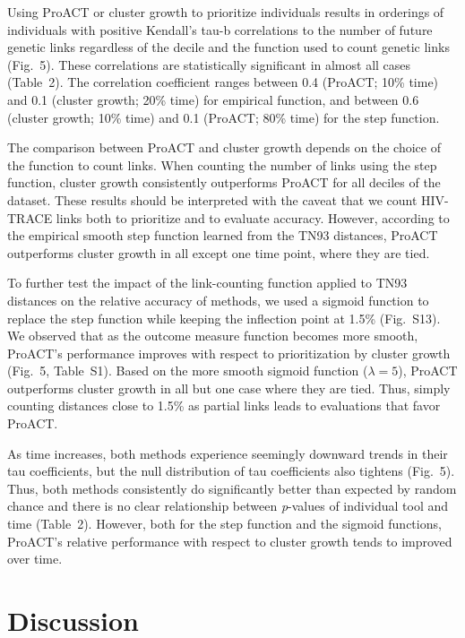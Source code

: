 \documentclass[a4paper,11pt]{article}
\begin{document}
Using ProACT or cluster growth to prioritize individuals results in orderings of individuals with positive Kendall's tau-b correlations to the number of future genetic links  regardless of the  decile and the function used to count genetic links (Fig.~5).  
These correlations are statistically significant in almost all cases  (Table~2). 
The  correlation coefficient  ranges between 0.4 (ProACT; 10\% time)  and 0.1 (cluster growth; 20\% time) for empirical function, and 
between 0.6 (cluster growth; 10\% time) and 0.1 (ProACT; 80\% time) for the step function.

The comparison between ProACT and cluster growth depends on the choice of the function to count links. 
When counting the number of links using the step function,
cluster growth consistently outperforms ProACT for all deciles of the dataset.
These results should be interpreted with the caveat  that we count HIV-TRACE links both to prioritize and to evaluate accuracy. 
However, 
according to the empirical smooth step function learned from the TN93 distances, ProACT outperforms cluster growth in all except one time point, where they are tied.

To further test the impact of the link-counting function applied to TN93 distances on  the relative accuracy of methods, we used a sigmoid function to replace the step function while keeping the inflection point at 1.5\% (Fig.~S13). 
We observed that as the outcome measure function becomes more smooth,
ProACT's performance improves with respect to prioritization by cluster growth (Fig.~5, Table~S1).
Based on the more smooth sigmoid function ($\lambda=5$), ProACT outperforms cluster growth in all but one case where they are tied.  
Thus, simply counting distances close to 1.5\% as partial links leads to evaluations that favor ProACT.



As time increases, both methods experience seemingly downward trends in their tau coefficients, but the null distribution of tau coefficients also tightens  (Fig.~5). Thus,  both methods consistently do significantly better than expected by random chance and there is no clear relationship between \textit{p}-values of individual tool and time (Table~2).
However, both for the step function and the sigmoid functions, ProACT's relative performance with respect to cluster growth tends to improved over time.

\section{Discussion}
\end{document}
